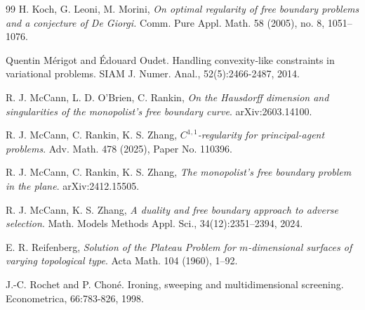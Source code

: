 \documentclass[reqno,11pt]{amsart}
\numberwithin{equation}{section}
\theoremstyle{remark}
\begin{document}
\begin{thebibliography}{99}
H. Koch, G. Leoni, M. Morini, 
\emph{On optimal regularity of free boundary problems and a conjecture of De Giorgi. }
Comm. Pure Appl. Math. 58 (2005), no. 8, 1051--1076.

Quentin M\'erigot and \'Edouard Oudet. Handling convexity-like constraints in variational
problems. SIAM J. Numer. Anal., 52(5):2466-2487, 2014.

R. J. McCann, L. D. O'Brien, C. Rankin, 
\emph{On the Hausdorff dimension and singularities of the monopolist's free boundary curve}. arXiv:2603.14100.

R. J. McCann, C. Rankin, K. S. Zhang, 
\emph{$C^{1,1}$-regularity for principal-agent problems}.
Adv. Math. 478 (2025), Paper No. 110396.

R. J. McCann, C. Rankin, K. S. Zhang, 
\emph{The monopolist's free boundary problem in the plane}. arXiv:2412.15505.

R. J. McCann, K. S. Zhang, \emph{A duality and free boundary
approach to adverse selection}. Math. Models Methods Appl. Sci., 34(12):2351--2394, 2024. 

E. R. Reifenberg, \emph{Solution of the Plateau Problem for $m$-dimensional surfaces of varying topological type}.
Acta Math. 104 (1960), 1--92.

J.-C. Rochet and P. Chon\'e. Ironing, sweeping and multidimensional screening. Econometrica,
66:783-826, 1998.



\end{thebibliography}
\end{document}
